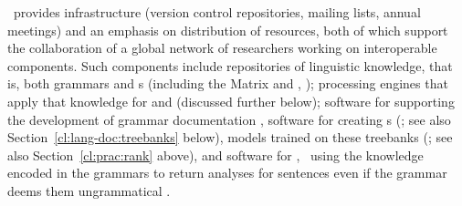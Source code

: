 \documentclass[output=paper
	        ,collection
	        ,collectionchapter
 	        ,biblatex
                ,babelshorthands
                ,newtxmath
                ,draftmode
                ,colorlinks, citecolor=brown
]{langscibook}
\begin{document}
\delphin\ provides infrastructure (version control repositories,
mailing lists, annual meetings) and an emphasis on 
distribution of resources, both of which support the collaboration of a
global network of researchers working on interoperable
components. Such components include repositories of linguistic knowledge, that
is, both grammars and s (including the Matrix and ,
\citealt{Fokkens:14}); processing engines that apply that
knowledge for  and  (discussed further below);
software for supporting the development of grammar documentation
\citep[e.g.,][]{Hashimoto-etal:07}, software for creating s
(\citealt{OFTM2004a-u,Packard:15}; see also Section~\ref{cl:lang-doc:treebanks} below), 
 models trained on these treebanks
(\citealt{Tou:Man:Fli:Oep:05}; see also Section~\ref{cl:prac:rank} above), and
software for , \ie\ using the knowledge encoded in
the grammars to return analyses for sentences even if the grammar
deems them ungrammatical
\citep{W11-2923,buys2017parse,chen2018parse}.
\end{document}
